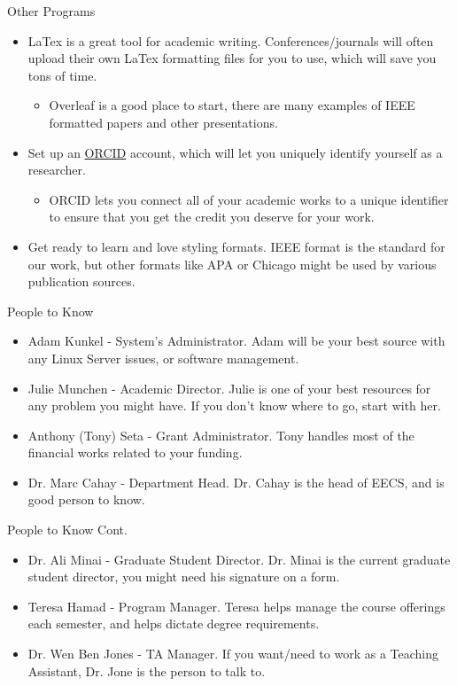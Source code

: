 \documentclass[handout]{beamer}
\begin{document}
\begin{frame}{Other Programs}
\begin{itemize}
  \item LaTex is a great tool for academic writing. Conferences/journals will often upload their own LaTex formatting files for you to use, which will save you tons of time. 
  \begin{itemize}
      \item Overleaf is a good place to start, there are many examples of IEEE formatted papers and other presentations.
  \end{itemize}
  \item Set up an \href{https://orcid.org/}{ORCID} account, which will let you uniquely identify yourself as a researcher.
  \begin{itemize}
    \item ORCID lets you connect all of your academic works to a unique identifier to ensure that you get the credit you deserve for your work.
  \end{itemize}
  \item Get ready to learn and love styling formats. IEEE format is the standard for our work, but other formats like APA or Chicago might be used by various publication sources.
\end{itemize}
\end{frame}

\begin{frame}{People to Know}
\begin{itemize}
  \item Adam Kunkel - System's Administrator. Adam will be your best source with any Linux Server issues, or software management.
  \item Julie Munchen - Academic Director. Julie is one of your best resources for any problem you might have. If you don't know where to go, start with her.
  \item Anthony (Tony) Seta - Grant Administrator. Tony handles most of the financial works related to your funding. 
  \item Dr. Marc Cahay - Department Head. Dr. Cahay is the head of EECS, and is good person to know.
\end{itemize}
\end{frame}

\begin{frame}{People to Know Cont.}
  \begin{itemize}
    \item Dr. Ali Minai - Graduate Student Director. Dr. Minai is the current graduate student director, you might need his signature on a form.
    \item Teresa Hamad - Program Manager. Teresa helps manage the course offerings each semester, and helps dictate degree requirements.
    \item Dr. Wen Ben Jones - TA Manager. If you want/need to work as a Teaching Assistant, Dr. Jone is the person to talk to.
  \end{itemize}
  \end{frame}
\end{document}
